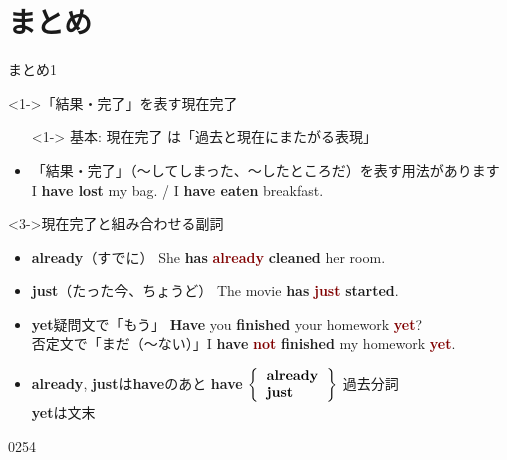 \documentclass[aspectratio=169,xcolor={dvipsnames,table}]{beamer}
\newcommand{\myaudio}[1]{\href{#1}{\faVolumeUp}}
\begin{document}
\section{まとめ}
\begin{frame}[plain,t]{まとめ1}

 \begin{block}<1->{「結果・完了」を表す現在完了}
\small
\begin{itemize}[square]\small
 \item[]<1-> 基本: 現在完了\,\,は「過去と現在にまたがる表現」
 \item<2-> 「結果・完了」（～してしまった、～したところだ）を表す用法があります\\
\hfill{}I {\bfseries have lost} my bag. / I {\bfseries have eaten} breakfast.
\end{itemize}
\end{block}
\vspace{-4pt}
\begin{block}<3->{現在完了と組み合わせる副詞}
\small
\begin{itemize}[square]\small
\setlength{\itemsep}{-1pt}
 \item<4-> \textbf{already}（すでに）
 \hfill{}She {\bfseries has} \textcolor{Maroon}{\bfseries already} {\bfseries cleaned} her room.
 \item<5-> \textbf{just}（たった今、ちょうど）
\hfill{}The movie {\bfseries has} \textcolor{Maroon}{\bfseries just} {\bfseries started}.
 \item<6-> \textbf{yet}\hspace{5pt}疑問文で「もう」%
\hfill{}{\bfseries Have} you {\bfseries finished} your homework \textcolor{Maroon}{\bfseries yet}?\\
\mbox{}\hspace{19pt}否定文で「まだ（～ない）」\hfill{}I {\bfseries have} \textcolor{Maroon}{\bfseries not} {\bfseries finished} my homework \textcolor{Maroon}{\bfseries yet}.
\item<7-> \textbf{already}, \textbf{just}は\textbf{have}のあと%
\hfill\textbf{have} $\left\{
       \begin{tabular}{l}
	\textbf{already}\\
	\textbf{just}
       \end{tabular}
\right\}$ 過去分詞\\
\textbf{yet}は文末
\end{itemize}
      \end{block}

\vspace{-15pt}

\hfill{\scriptsize 0254}\,{\scriptsize \myaudio{./audio/014_have_pp_kekka_07.mp3}}

\end{frame}
\end{document}

